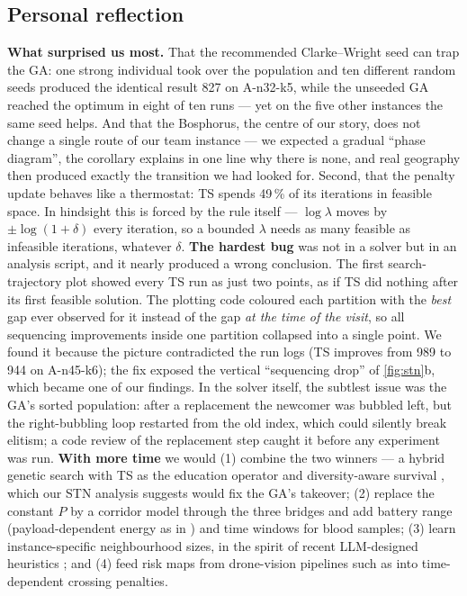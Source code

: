 \subsection*{Personal reflection}
\textbf{What surprised us most.} That the recommended Clarke--Wright seed can trap the GA: one strong individual took
over the population and ten different random seeds produced the identical result 827 on A-n32-k5, while the unseeded
GA reached the optimum in eight of ten runs --- yet on the five other instances the same seed helps. And that the Bosphorus,
the centre of our story, does not change a single route of our team instance --- we expected a gradual ``phase
diagram'', the corollary explains in one line why there is none, and real geography then produced exactly the
transition we had looked for. Second, that the
penalty update behaves like a thermostat: TS spends 49\,\% of its iterations in feasible space. In hindsight this is
forced by the rule itself --- $\log\lambda$ moves by $\pm\log(1+\delta)$ every iteration, so a bounded $\lambda$ needs as
many feasible as infeasible iterations, whatever $\delta$.
\textbf{The hardest bug} was not in a solver but in an analysis script, and it nearly produced a wrong conclusion. The
first search-trajectory plot showed every TS run as just two points, as if TS did nothing after its first feasible
solution. The plotting code coloured each partition with the \emph{best} gap ever observed for it instead of the gap
\emph{at the time of the visit}, so all sequencing improvements inside one partition collapsed into a single point. We
found it because the picture contradicted the run logs (TS improves from 989 to 944 on A-n45-k6); the fix exposed the
vertical ``sequencing drop'' of \cref{fig:stn}b, which became one of our findings. In the solver itself, the subtlest
issue was the GA's sorted population: after a replacement the newcomer was bubbled left, but the right-bubbling loop
restarted from the old index, which could silently break elitism; a code review of the replacement step caught it
before any experiment was run.
\textbf{With more time} we would (1) combine the two winners --- a hybrid genetic search with TS as the education
operator and diversity-aware survival \citep{vidal2012hybrid,vidal2022hybrid}, which our STN analysis suggests would fix
the GA's takeover; (2) replace the constant $P$ by a corridor model through the three bridges and add battery range
(payload-dependent energy as in \citep{dorling2017vehicle}) and time windows for blood samples; (3) learn instance-specific
neighbourhood sizes, in the spirit of recent LLM-designed heuristics \citep{xie2026enhancing}; and (4) feed risk maps
from drone-vision pipelines such as \citep{alpay2026pattern} into time-dependent crossing penalties.
